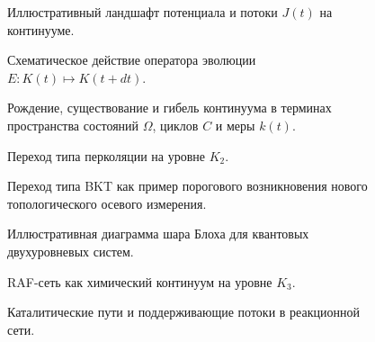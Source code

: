 \begin{figure}[p]
  \centering
  
  \caption{Иллюстративный ландшафт потенциала и потоки \(J(t)\) на континууме.}
  \label{fig:potential-landscape}
\end{figure}

\begin{figure}[p]
  \centering
  
  \caption{Схематическое действие оператора эволюции
           \(E : K(t) \mapsto K(t+dt)\).}
  \label{fig:evolution-operator}
\end{figure}

\begin{figure}[p]
  \centering
  
  \caption{Рождение, существование и гибель континуума в терминах пространства состояний
           \texorpdfstring{\(\Omega\)}{\Omega}, циклов
           \texorpdfstring{\(C\)}{C} и меры \(k(t)\).}
  \label{fig:birth-life-death}
\end{figure}

\begin{figure}[p]
  \centering
  
  \caption{Переход типа перколяции на уровне
           \texorpdfstring{\(K_2\)}{K_2}.}
  \label{fig:percolation}
\end{figure}

\begin{figure}[p]
  \centering
  
  \caption{Переход типа BKT как пример порогового возникновения
           нового топологического осевого измерения.}
  \label{fig:bkt-transition}
\end{figure}

\begin{figure}[p]
  \centering
  
  \caption{Иллюстративная диаграмма шара Блоха для квантовых двухуровневых систем.}
  \label{fig:bloch-sphere}
\end{figure}

\begin{figure}[p]
  \centering
  
  \caption{RAF-сеть как химический континуум на уровне
           \texorpdfstring{\(K_3\)}{K_3}.}
  \label{fig:raf-network}
\end{figure}

\begin{figure}[p]
  \centering
  
  \caption{Каталитические пути и поддерживающие потоки в реакционной сети.}
  \label{fig:catalytic-paths}
\end{figure}

